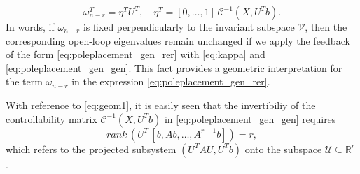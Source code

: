 \documentclass[conference]{IEEEtran}
\newcommand{\msu}{\mathcal{U}}
\newcommand{\msv}{\mathcal{V}}
\newcommand{\om}{\omega}
\begin{document}
\begin{equation}
\label{eq:poleplacement_gen_gen}
\om_{n-r}^T =\eta^T U^T,\quad \eta^T= [0,\ldots,1]\,\mathcal{C}^{-1}(X,U^T b).
\end{equation}
In words, {if $\om_{n-r}$ is fixed perpendicularly to the invariant subspace $\msv$, then the corresponding open-loop eigenvalues remain unchanged} if we apply the feedback of the form \eqref{eq:poleplacement_gen_rer} with \eqref{eq:kappa} and \eqref{eq:poleplacement_gen_gen}. This fact provides a geometric interpretation for the term $\om_{n-r}$ in the expression \eqref{eq:poleplacement_gen_rer}.

With reference to \eqref{eq:geom1},  it is easily seen that the invertibiliy of the controllability matrix $\mathcal{C}^{-1}(X,U^T b)$ in \eqref{eq:poleplacement_gen_gen} requires
\[
\textit{rank}\, (U^T \, [b, Ab,\ldots, A^{r-1}b]) = r,
\]
which refers to the projected subsystem $(U^TAU,U^Tb)$ onto the subspace $\msu\subseteq\mathbb{R}^r$ \cite{Saad86}.
\end{document}
